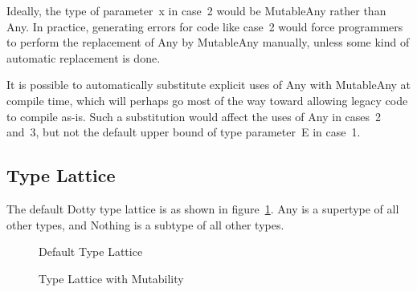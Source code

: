 Ideally, the type of parameter~{\cd x} in case~2 would be {\cd MutableAny} rather than {\cd Any}. In practice, generating errors for code like case~2 would force programmers to perform the replacement of {\cd Any} by {\cd MutableAny} manually, unless some kind of automatic replacement is done.

It is possible to automatically substitute explicit uses of {\cd Any} with {\cd MutableAny} at compile time, which will perhaps go most of the way toward allowing legacy code to compile as-is. Such a substitution would affect the uses of {\cd Any} in cases~2 and~3, but not the default upper bound of type parameter~{\cd E} in case~1.

\subsection{Type Lattice}

The default Dotty type lattice is as shown in figure~\ref{fig:default-type-lattice}. {\cd Any} is a supertype of all other types, and {\cd Nothing} is a subtype of all other types.

\begin{figure}[htbp]
\center
{}
\caption{Default Type Lattice}
\label{fig:default-type-lattice}
\end{figure}

\begin{figure}[htbp]
\center
{}
\caption{Type Lattice with Mutability}
\label{fig:type-lattice-with-mutability}
\end{figure}

